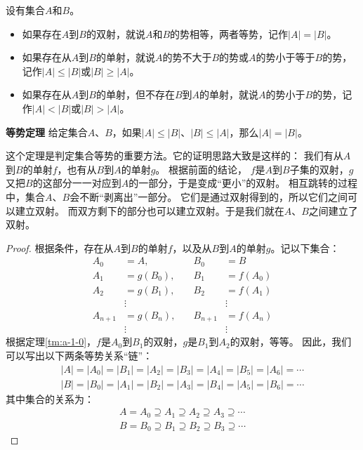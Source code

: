 \documentclass[12pt,UTF8]{ctexbook}
\begin{document}
\begin{appendix}
\begin{df}\label{df:a-1-10}
    设有集合$A$和$B$。
    \begin{itemize}
        \item 如果存在$A$到$B$的双射，就说$A$和$B$的势相等，两者等势，记作$|A| = |B|$。
        \item 如果存在从$A$到$B$的单射，就说$A$的势不大于$B$的势或$A$的势小于等于$B$的势，记作$|A| \leqslant |B|$或$|B| \geqslant |A|$。
        \item 如果存在从$A$到$B$的单射，但不存在$B$到$A$的单射，就说$A$的势小于$B$的势，记作$|A| < |B|$或$|B| > |A|$。
    \end{itemize}
\end{df}

\begin{tm}{\textbf{等势定理}}\label{tm:a-1-10}
    给定集合$A$、$B$，如果$|A| \leqslant |B|$、$|B| \leqslant |A|$，那么$|A| = |B|$。
\end{tm}

这个定理是判定集合等势的重要方法。它的证明思路大致是这样的：
我们有从$A$到$B$的单射$f$，也有从$B$到$A$的单射$g$。
根据前面的结论，
$f$是$A$到$B$子集的双射，$g$又把$B$的这部分一一对应到$A$的一部分，于是变成“更小”的双射。
相互跳转的过程中，集合$A$、$B$会不断“剥离出”一部分。
它们是通过双射得到的，所以它们之间可以建立双射。
而双方剩下的部分也可以建立双射。于是我们就在$A$、$B$之间建立了双射。

\begin{proof}
    根据条件，存在从$A$到$B$的单射$f$，以及从$B$到$A$的单射$g$。记以下集合：
    $$
    \begin{array}{rlrl}
        A_0&= A, \quad & B_0 &= B \\
        A_1&= g(B_0), \quad & B_1 &= f(A_0) \\
        A_2&= g(B_1), \quad & B_2 &= f(A_1) \\
        &\vdots & &\vdots \\
        A_{n+1}&= g(B_n), \quad & B_{n+1} &= f(A_n) \\
        &\vdots & &\vdots
    \end{array}
    $$
    根据定理\ref{tm:a-1-0}，$f$是$A_0$到$B_1$的双射，$g$是$B_1$到$A_2$的双射，等等。
    因此，我们可以写出以下两条等势关系“链”：
    \begin{align*}
        |A| = |A_0| = |B_1| = |A_2| = |B_3| = |A_4| = |B_5| = |A_6| = \cdots  \\
        |B| = |B_0| = |A_1| = |B_2| = |A_3| = |B_4| = |A_5| = |B_6| = \cdots   
    \end{align*}
    其中集合的关系为：
    \begin{align*}
        A = A_0 \supseteq A_1 \supseteq A_2 \supseteq A_3  \supseteq \cdots  \\
        B = B_0 \supseteq B_1 \supseteq B_2 \supseteq B_3  \supseteq \cdots   
    \end{align*}
    

\end{proof}
\end{appendix}
\end{document}
